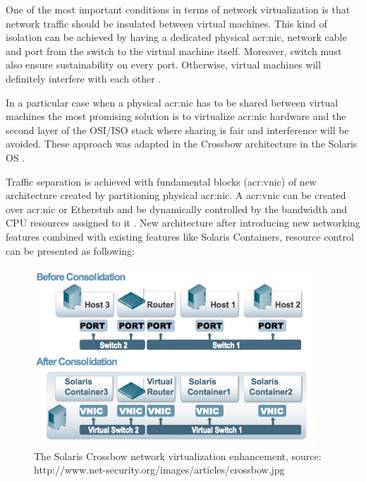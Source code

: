\documentclass[11pt]{book}
\begin{document}
        One of the most important conditions in terms of network virtualization is that network traffic should be
        insulated between virtual machines. This kind of isolation can be achieved by having a dedicated physical
        \gls{acr:nic}, network cable and port from the switch to the virtual machine itself. Moreover, switch must also
        ensure sustainability on every port. Otherwise, virtual machines will definitely interfere with each other
        \cite{crossbow}.
        
        In a particular case when a physical \gls{acr:nic} has to be shared between virtual machines the most promising
        solution is to virtualize \gls{acr:nic} hardware and the second layer of the OSI/ISO stack where sharing is fair
        and interference will be avoided. These approach was adapted in the Crossbow architecture in the Solaris OS
        \cite{crossbow}.
        
        Traffic separation is achieved with fundamental blocks (\gls{acr:vnic}) of new architecture created by
        partitioning physical \gls{acr:nic}. A \gls{acr:vnic} can be created over \gls{acr:nic} or Etherstub and be
        dynamically controlled by the bandwidth and CPU resources assigned to it \cite{crossbow,network_virtualization}.
        New architecture after introducing new networking features combined with existing features like Solaris
        Containers, resource control can be presented as following:

        \begin{figure}[H]
          \begin{center}
            \includegraphics[width=.7\textwidth]{img/crossbow.jpg}
          \end{center}

          \caption{The Solaris Crossbow network virtualization enhancement, source: http://www.net-security.org/images/articles/crossbow.jpg}
        \end{figure}
\end{document}
